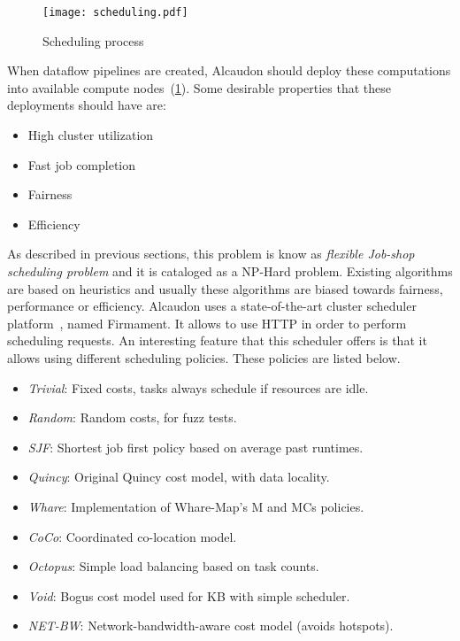 \begin{figure}[!h]
  \centering
  \texttt{[image: scheduling.pdf]}
  \caption{Scheduling process}
  \label{fig:scheduler}
\end{figure}

When dataflow pipelines are created, Alcaudon should deploy these computations
into available compute nodes~(\ref{fig:scheduler}). Some desirable properties that
these deployments should have are:

\begin{itemize}
\item High cluster utilization
\item Fast job completion
\item Fairness
\item Efficiency
\end{itemize}

As described in previous sections, this problem is know as
\textit{flexible Job-shop scheduling problem} and it is cataloged as a NP-Hard
problem. Existing algorithms are based on heuristics and usually these
algorithms are biased towards fairness, performance or efficiency.
Alcaudon uses a state-of-the-art cluster scheduler platform~\cite{firmament},
named Firmament. It allows to use \acs{HTTP} in order to perform scheduling
requests. An interesting feature that this scheduler offers is that it allows
using different scheduling policies. These policies are listed below.

\begin{itemize}
\item \textit{Trivial}: Fixed costs, tasks always schedule if resources are idle.
\item \textit{Random}: Random costs, for fuzz tests.
\item \textit{SJF}: Shortest job first policy based on average past runtimes.
\item \textit{Quincy}: Original Quincy cost model, with data locality.
\item \textit{Whare}: Implementation of Whare-Map's M and MCs policies.
\item \textit{CoCo}: Coordinated co-location model.
\item \textit{Octopus}: Simple load balancing based on task counts.
\item \textit{Void}: Bogus cost model used for KB with simple scheduler.
\item \textit{NET-BW}: Network-bandwidth-aware cost model (avoids hotspots).
\end{itemize}

